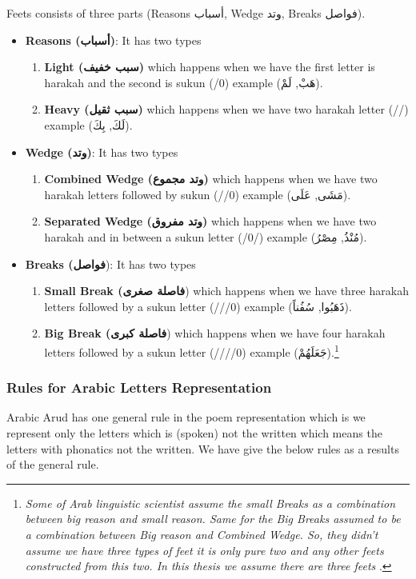 Feets consists of three parts (Reasons \textarabic{أسباب}, Wedge \textarabic{وتد}, Breaks \textarabic{فواصل}).
\begin{itemize}
\item \textbf{Reasons (\textarabic{أسباب})}: It has two types
  \begin{enumerate}
  \item \textbf{Light (\textarabic{سبب خفيف})} which happens when we have the first letter is harakah and the second is sukun (/0) example (\textarabic{هَبْ, لَمْ}).
    \item \textbf{Heavy (\textarabic{سبب ثقيل})} which happens when we have two harakah letter (//) example (\textarabic{لَكَ, بِكَ}).
    \end{enumerate}
    \item \textbf{Wedge (\textarabic{وتد})}: It has two types
  \begin{enumerate}
  \item \textbf{Combined Wedge (\textarabic{وتد مجموع})} which happens when we have two harakah letters followed by sukun (//0) example (\textarabic{مَشَى, عَلَى}).
    \item \textbf{Separated Wedge (\textarabic{وتد مفروق})} which happens when we have two harakah and in between a sukun letter (/0/) example (\textarabic{مُنْذُ, مِصْرُ}).
    \end{enumerate}
    \item \textbf{Breaks (\textarabic{فواصل}}): It has two types
  \begin{enumerate}
  \item \textbf{Small Break (\textarabic{فاصلة صغرى}}) which happens when we have three harakah letters followed by a sukun letter (///0) example (\textarabic{ذَهَبُوا, سُفُناً}).
    \item \textbf{Big Break (\textarabic{فاصلة كبرى}}) which happens when we have four harakah letters followed by a sukun letter  (////0) example (\textarabic{جَعَلَهُمْ}).\footnote{\textit{Some of Arab linguistic scientist assume the small Breaks as a combination between big reason and small reason. Same for the Big Breaks assumed to be a combination between Big reason and Combined Wedge. So, they didn't assume we have three types of feet it is only pure two and any other feets constructed from this two. In this thesis we assume there are three feets }.}
    \end{enumerate}
  \end{itemize}

\newpage
  \subsubsection{Rules for Arabic Letters Representation}
  Arabic Arud has one general rule in the poem representation which is we represent only the letters which is (spoken) not the written which means the letters with phonatics not the written. We have give the below rules as a results of the general rule.

